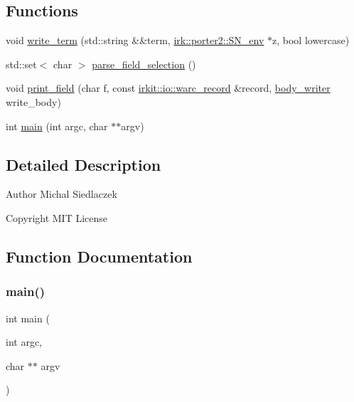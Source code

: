\subsection*{Functions}
\begin{DoxyCompactItemize}
\item 
void \mbox{\hyperlink{irk-warc_8cpp_af7d34b3e12bc004e9cc0041e2053ac42}{write\+\_\+term}} (std\+::string \&\&term, \mbox{\hyperlink{structirk_1_1porter2_1_1SN__env}{irk\+::porter2\+::\+S\+N\+\_\+env}} $\ast$z, bool lowercase)
\item 
std\+::set$<$ char $>$ \mbox{\hyperlink{irk-warc_8cpp_a540445d56c199741b8ec16c28c40f5e0}{parse\+\_\+field\+\_\+selection}} ()
\item 
void \mbox{\hyperlink{irk-warc_8cpp_aeaa9afcbcca6c9cac8dfed13f3ec5b3d}{print\+\_\+field}} (char f, const \mbox{\hyperlink{classirkit_1_1io_1_1warc__record}{irkit\+::io\+::warc\+\_\+record}} \&record, \mbox{\hyperlink{structbody__writer}{body\+\_\+writer}} write\+\_\+body)
\item 
int \mbox{\hyperlink{irk-warc_8cpp_a3c04138a5bfe5d72780bb7e82a18e627}{main}} (int argc, char $\ast$$\ast$argv)
\end{DoxyCompactItemize}


\subsection{Detailed Description}
\begin{DoxyAuthor}{Author}
Michal Siedlaczek 
\end{DoxyAuthor}
\begin{DoxyCopyright}{Copyright}
M\+IT License 
\end{DoxyCopyright}


\subsection{Function Documentation}
\mbox{\label{irk-warc_8cpp_a3c04138a5bfe5d72780bb7e82a18e627}} 
\subsubsection{\texorpdfstring{main()}{main()}}
{\footnotesize\ttfamily int main (\begin{DoxyParamCaption}\item[{int}]{argc,  }\item[{char $\ast$$\ast$}]{argv }\end{DoxyParamCaption})}

